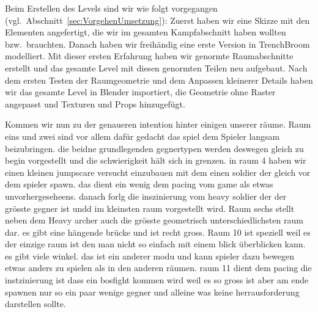 \documentclass[../Main.tex]{subfiles}
\begin{document}
Beim Erstellen des Levels sind wir wie folgt vorgegangen (vgl.\ Abschnitt~\ref{sec:VorgehenUmsetzung}): Zuerst haben wir eine Skizze mit den Elementen angefertigt, die wir im gesamten Kampfabschnitt haben wollten bzw.\ brauchten. Danach haben wir freihändig eine erste Version in TrenchBroom modelliert. Mit dieser ersten Erfahrung haben wir genormte Raumabschnitte erstellt und das gesamte Level mit diesen genormten Teilen neu aufgebaut. Nach dem ersten Testen der Raumgeometrie und dem Anpassen kleinerer Details haben wir das gesamte Level in Blender importiert, die Geometrie ohne Raster angepasst und Texturen und Props hinzugefügt.

Kommen wir nun zu der genaueren intention hinter einigen unserer räume. Raum eins und zwei sind vor allem dafür gedacht das spiel dem Spieler langsam beizubringen. die beidne grundlegenden gegnertypen werden deswegen gleich zu begin vorgestellt und die schwierigkeit hält sich in grenzen. in raum 4 haben wir einen kleinen jumpscare versucht einzubauen mit dem einen soldier der gleich vor dem spieler spawn. das dient ein wenig dem pacing vom game als etwas unvorhergeseheens. danach forlg die inszinierung vom heavy soldier der der grösste gegner ist undd im kleinsten raum vorgestellt wird. Raum sechs stellt neben dem Heavy archer auch die grösste geometrisch unterschiedlichsten raum dar. es gibt eine hängende brücke und ist recht gross. Raum 10 ist speziell weil es der einzige raum ist den man nicht so einfach mit einem blick überblicken kann. es gibt viele winkel. das ist ein anderer modu und kann spieler dazu bewegen etwas anders zu spielen als in den anderen räumen. raum 11 dient dem pacing die instzinierung ist dass ein bosfight kommen wird weil es so gross ist aber am ende spawnen nur so ein paar wenige gegner und alleine was keine herrausforderung darstellen sollte.
\end{document}
